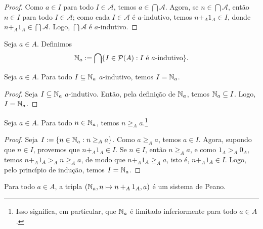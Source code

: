 \begin{proof} 
    Como $a \in I$ para todo $I \in \mathcal{A}$, temos $a \in \bigcap \mathcal{A}$. Agora, se $n \in \bigcap \mathcal{A}$, então $n \in I$ para todo $I \in \mathcal{A}$; como cada $I \in \mathcal{A}$ é $a$-indutivo, temos $n +_{A} 1_{A} \in I$, donde $n +_{A} 1_{A} \in \bigcap \mathcal{A}$. Logo, $\bigcap \mathcal{A}$ é $a$-indutivo. \blackproof
\end{proof}

\begin{definition}
    Seja $a \in A$. Definimos
        \[
            \mathbb{N}_{a} := \bigcap \{ I \in \mathcal{P}{(A)} : I \text{ é } a\text{-indutivo} \}.
        \]
\end{definition}

\begin{theorem} \label{teo.set:indução_imersão_domínios}
    Seja $a \in A$. Para todo $I \subseteq \mathbb{N}_{a}$ $a$-indutivo, temos $I = \mathbb{N}_{a}$.
\end{theorem}

\begin{proof}
    Seja $I \subseteq \mathbb{N}_{a}$ $a$-indutivo. Então, pela definição de $\mathbb{N}_{a}$, temos $\mathbb{N}_{a} \subseteq I$. Logo, $I = \mathbb{N}_{a}$. \blackproof
\end{proof}

\begin{lemma}
    Seja $a \in A$. Para todo $n \in \mathbb{N}_{a}$, temos $n \geq_{A} a$.\footnote{Isso significa, em particular, que $\mathbb{N}_{a}$ é limitado inferiormente para todo $a \in A$.}
\end{lemma}

\begin{proof}
    Seja $I := \{ n \in \mathbb{N}_{a} : n \geq_{A} a\}$. Como $a \geq_{A} a$, temos $a \in I$. Agora, supondo que $n \in I$, provemos que $n +_{A} 1_{A} \in I$. Se $n \in I$, então $n \geq_{A} a$, e como $1_{A} >_{A} 0_{A}$, temos $n +_{A} 1_{A} >_{A} n \geq_{A} a$, de modo que $n +_{A} 1_{A} \geq_{A} a$, isto é, $n +_{A} 1_{A} \in I$. Logo, pelo princípio de indução, temos $I = \mathbb{N}_{a}$. \blackproof
\end{proof}

\begin{theorem} \label{teo.set:imersao_naturais_dominio_ordenado}
    Para todo $a \in A$, a tripla $(\mathbb{N}_{a}, n \mapsto n +_{A} 1_{A}, a)$ é um sistema de Peano.
\end{theorem}

